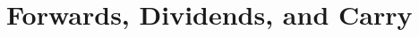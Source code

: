 %
\renewcommand{\figdir}{figures/ch06}
\chapter[Forwards, dividends, and carry]{Forwards, Dividends, and Carry}
\label{ch:fwd}

